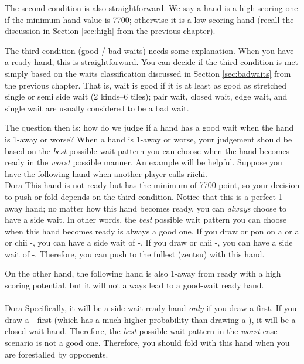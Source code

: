 \bigskip
The second condition is also straightforward. We say a hand is a high scoring one if the minimum hand value is 7700; otherwise it is a low scoring hand (recall the discussion in Section \ref{sec:high} from the previous chapter). 

\bigskip
The third condition (good / bad waits) needs some explanation. When you have a ready hand, this is straightforward. You can decide if the third condition is met simply based on the waits classification discussed in Section \ref{sec:badwaits} from the previous chapter. That is, wait is good if it is at least as good as stretched single or semi side wait (2 kinds--6 tiles); pair wait, closed wait, edge wait, and single wait are usually considered to be a bad wait. 

\bigskip
The question then is: how do we judge if a hand has a good wait when the hand is 1-away or worse? 
When a hand is 1-away or worse, your judgement should be based on the \emph{best} possible wait pattern you can choose when the hand becomes ready in the \emph{worst} possible manner. An example will be helpful. Suppose you have the following hand when another player calls {\jap riichi}. 
\bp
{}\fa\fa\fa\bei~~\fa\\
\hspace{315pt}\footnotesize{\jap Dora}
\ep {}
This hand is not ready but has the minimum of 7700 point, so your decision to push or fold depends on the third condition. Notice that this is a perfect 1-away hand; no matter how this hand becomes ready, you can \emph{always} choose to have a side wait. In other words, the \emph{best} possible wait pattern you can choose when this hand becomes ready is always a good one. If you draw or {\jap pon} on a {\large {}} or a {\large {}} or {\jap chii} {\large {}-}, you can have a side wait of {\large{}-}. If you draw or {\jap chii} {\large {}-}, you can have a side wait of {\large{}-}. Therefore, you can push to the fullest ({\jap zentsu}) with this hand.

\bigskip
On the other hand, the following hand is also 1-away from ready with a high scoring potential, but it will not always lead to a good-wait ready hand. 
\vspace{-25pt}
\bp 
{}\\ \vspace{-18pt}
\rfd{}\bei~~\\
\hspace{315pt}\footnotesize{\jap Dora}
\ep
Specifically, it will be a side-wait ready hand \emph{only} if you draw a {\large{}} first. If you draw a {\large{}-} first (which has a much higher probability than drawing a {\large{}}), it will be a closed-wait hand. Therefore, the \emph{best} possible wait pattern in the \emph{worst}-case scenario is not a good one. Therefore, you should fold with this hand when you are forestalled by opponents. 

